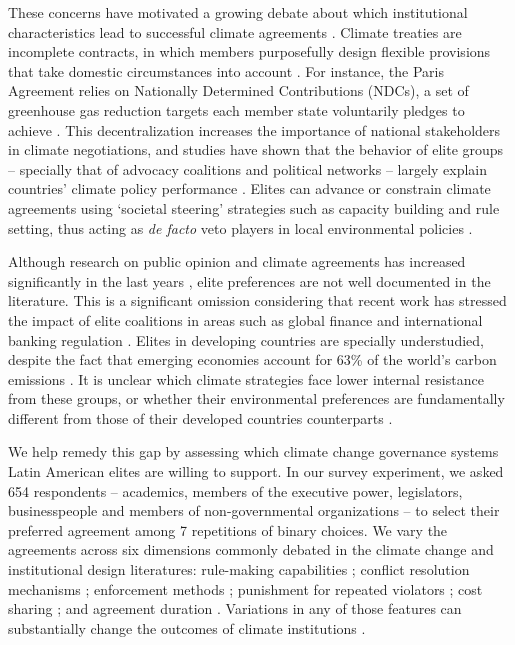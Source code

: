 \documentclass[a4paper,12pt]{article}
\begin{document}
These concerns have motivated a growing debate about which institutional characteristics lead to successful climate agreements \citep[e.g.,][]{bechtel2013mass, bechtel2017interests, keohane2011regime, mitchell2006problem, ostrom2014polycentric}. Climate treaties are incomplete contracts, in which members purposefully design flexible provisions that take domestic circumstances into account \citep[607]{brauninger2000making}. For instance, the Paris Agreement relies on Nationally Determined Contributions (NDCs), a set of greenhouse gas reduction targets each member state voluntarily pledges to achieve \citep{winning2019nationally}. This decentralization increases the importance of national stakeholders in climate negotiations, and studies have shown that the behavior of elite groups -- specially that of advocacy coalitions and political networks -- largely explain countries' climate policy performance \citep{jahn2016politics, karapin2012explaining}. Elites can advance or constrain climate agreements using `societal steering' strategies such as capacity building and rule setting, thus acting as \textit{de facto} veto players in local environmental policies \citep{andonova2009transnational, bulkeley2014transnational}.

Although research on public opinion and climate agreements has increased significantly in the last years \citep[e.g.,][]{aklin2013understanding, bechtel2013mass, bechtel2017interests, mildenberger2017beliefs}, elite preferences are not well documented in the literature. This is a significant omission considering that recent work has stressed the impact of elite coalitions in areas such as global finance and international banking regulation \citep[e.g,][]{chalmers2017banks, pagliari2014leveraged}. Elites in developing countries are specially understudied, despite the fact that emerging economies account for 63\% of the world's carbon emissions \citep{busch2015developing}. It is unclear which climate strategies face lower internal resistance from these groups, or whether their environmental preferences are fundamentally different from those of their developed countries counterparts \citep[28]{aklin2013understanding}.

We help remedy this gap by assessing which climate change governance systems Latin American elites are willing to support. In our survey experiment, we asked 654 respondents -- academics, members of the executive power, legislators, businesspeople and members of non-governmental organizations -- to select their preferred agreement among 7 repetitions of binary choices. We vary the agreements across six dimensions commonly debated in the climate change and institutional design literatures: rule-making capabilities \citep{dubash2013developments, massey2014climate}; conflict resolution mechanisms \citep{huntjens2012institutional, ostrom2014polycentric}; enforcement methods \citep{barrett2008climate}; punishment for repeated violators \citep{ostrom1990governing}; cost sharing \citep{bechtel2013mass}; and agreement duration \citep{copelovitch2014design, marcoux2009institutional}. Variations in any of those features can substantially change the outcomes of climate institutions \citep{bodin2017collaborative, ostrom2014polycentric}.
\end{document}
